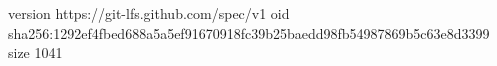 version https://git-lfs.github.com/spec/v1
oid sha256:1292ef4fbed688a5a5ef91670918fc39b25baedd98fb54987869b5c63e8d3399
size 1041
